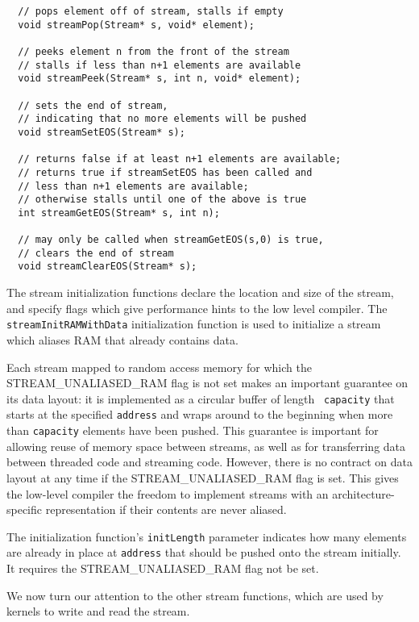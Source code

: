 {\begin{verbatim}
  // pops element off of stream, stalls if empty
  void streamPop(Stream* s, void* element);
  
  // peeks element n from the front of the stream
  // stalls if less than n+1 elements are available
  void streamPeek(Stream* s, int n, void* element);

  // sets the end of stream,
  // indicating that no more elements will be pushed  
  void streamSetEOS(Stream* s);

  // returns false if at least n+1 elements are available;
  // returns true if streamSetEOS has been called and
  // less than n+1 elements are available;
  // otherwise stalls until one of the above is true
  int streamGetEOS(Stream* s, int n);

  // may only be called when streamGetEOS(s,0) is true,
  // clears the end of stream
  void streamClearEOS(Stream* s);
\end{verbatim}}

 The stream initialization functions declare the location and size of the stream, and specify flags which give performance hints to the low level compiler. The {\tt streamInitRAMWithData} initialization function is used to initialize a stream which aliases RAM that already contains data.

Each stream mapped to random access memory for which the STREAM\_UNALIASED\_RAM flag is not set makes an important guarantee on its data layout: 
it is implemented as a circular buffer of length {\tt
capacity} that starts at the specified {\tt address} and wraps around to the beginning when more than {\tt capacity} elements have been pushed.  This guarantee is important for allowing reuse of memory space between streams, as well as for transferring data between threaded code and streaming code.  However, there is no contract on data layout at any time if the STREAM\_UNALIASED\_RAM flag is set. This gives 
the low-level compiler the freedom to implement streams with an 
architecture-specific representation if their contents are never aliased.

The initialization function's {\tt initLength} parameter indicates how many elements are already in place at {\tt address} that should be pushed onto the stream initially. It requires the STREAM\_UNALIASED\_RAM flag not be set.


We now turn our attention to the other stream functions, which are used by kernels to write and read the stream.


